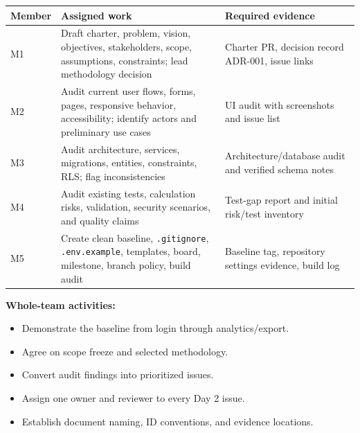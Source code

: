 \documentclass[
  10pt,
  a4paper,
  oneside]{report}
\newcounter{none} %
\providecommand{\tightlist}{%
  \setlength{\itemsep}{0pt}\setlength{\parskip}{0pt}}
\begin{document}
{\def\LTcaptype{none} %
\begin{longtable}[]{@{}
  >{\raggedright\arraybackslash}p{}
  >{\raggedright\arraybackslash}p{}
  >{\raggedright\arraybackslash}p{}@{}}
\toprule\noalign{}
\begin{minipage}[b]{\linewidth}\raggedright
Member
\end{minipage} & \begin{minipage}[b]{\linewidth}\raggedright
Assigned work
\end{minipage} & \begin{minipage}[b]{\linewidth}\raggedright
Required evidence
\end{minipage} \\
\midrule\noalign{}
\endhead
\bottomrule\noalign{}
\endlastfoot
M1 & Draft charter, problem, vision, objectives, stakeholders, scope,
assumptions, constraints; lead methodology decision & Charter PR,
decision record ADR-001, issue links \\
M2 & Audit current user flows, forms, pages, responsive behavior,
accessibility; identify actors and preliminary use cases & UI audit with
screenshots and issue list \\
M3 & Audit architecture, services, migrations, entities, constraints,
RLS; flag inconsistencies & Architecture/database audit and verified
schema notes \\
M4 & Audit existing tests, calculation risks, validation, security
scenarios, and quality claims & Test-gap report and initial risk/test
inventory \\
M5 & Create clean baseline, \texttt{.gitignore}, \texttt{.env.example},
templates, board, milestone, branch policy, build audit & Baseline tag,
repository settings evidence, build log \\
\end{longtable}
}

\textbf{Whole-team activities:}

\begin{itemize}
\tightlist
\item
  Demonstrate the baseline from login through analytics/export.
\item
  Agree on scope freeze and selected methodology.
\item
  Convert audit findings into prioritized issues.
\item
  Assign one owner and reviewer to every Day 2 issue.
\item
  Establish document naming, ID conventions, and evidence locations.
\end{itemize}
\end{document}
